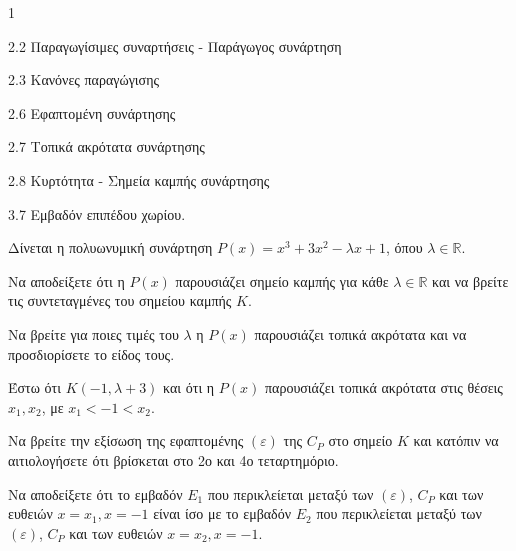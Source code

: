 \begin{ylh}{1}
    \item 2.2 Παραγωγίσιμες συναρτήσεις - Παράγωγος συνάρτηση
    \item 2.3 Κανόνες παραγώγισης
    \item 2.6 Εφαπτομένη συνάρτησης
    \item 2.7 Τοπικά ακρότατα συνάρτησης
    \item 2.8 Κυρτότητα - Σημεία καμπής συνάρτησης
    \item 3.7 Εμβαδόν επιπέδου χωρίου.
\end{ylh}
Δίνεται η πολυωνυμική συνάρτηση $P(x)=x^3+3x^2-\lambda x+1$, όπου $\lambda \in \mathbb{R}$.
\begin{alist}
\item Να αποδείξετε ότι η $P(x)$ παρουσιάζει σημείο καμπής για κάθε $\lambda \in \mathbb{R}$ και να βρείτε τις συντεταγμένες του σημείου καμπής $K$. 
\item Να βρείτε για ποιες τιμές του $\lambda$ η $P(x)$ παρουσιάζει τοπικά ακρότατα και να προσδιορίσετε το είδος τους. 
\item Έστω ότι $K(-1, \lambda+3)$ και ότι η $P(x)$ παρουσιάζει τοπικά ακρότατα στις θέσεις $x_1, x_2$, με $x_1 < -1 < x_2$.
    \begin{rlist}
    \item Να βρείτε την εξίσωση της εφαπτομένης $(\varepsilon)$ της $C_P$ στο σημείο $K$ και κατόπιν να αιτιολογήσετε ότι βρίσκεται στο 2ο και 4ο τεταρτημόριο. 
    \item Να αποδείξετε ότι το εμβαδόν $E_1$ που περικλείεται μεταξύ των $(\varepsilon)$, $C_P$ και των ευθειών $x=x_1, x=-1$ είναι ίσο με το εμβαδόν $E_2$ που περικλείεται μεταξύ των $(\varepsilon)$, $C_P$ και των ευθειών $x=x_2, x=-1$. 
    \end{rlist}
\end{alist}